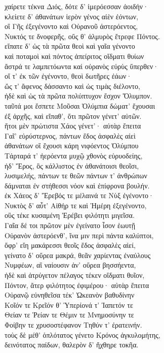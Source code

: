 \begin{pages}
\begin{Leftside}
\quad{}χαίρετε τέκνα Διός, δότε δ' ἱμερόεσσαν ἀοιδήν· \\
κλείετε δ' ἀθανάτων ἱερὸν γένος αἰὲν ἐόντων, \\
οἳ Γῆς ἐξεγένοντο καὶ Οὐρανοῦ ἀστερόεντος,\\
Νυκτός τε δνοφερῆς, οὕς θ' ἁλμυρὸς ἔτρεφε Πόντος.\\
εἴπατε δ' ὡς τὰ πρῶτα θεοὶ καὶ γαῖα γένοντο \\
καὶ ποταμοὶ καὶ πόντος ἀπείριτος οἴδματι θυίων \\
ἄστρά τε λαμπετόωντα καὶ οὐρανὸς εὐρὺς ὕπερθεν·  \\
οἵ τ' ἐκ τῶν ἐγένοντο, θεοὶ δωτῆρες ἐάων· \\
ὥς τ' ἄφενος δάσσαντο καὶ ὡς τιμὰς διέλοντο, \\
ἠδὲ καὶ ὡς τὰ πρῶτα πολύπτυχον ἔσχον Ὄλυμπον.\\
ταῦτά μοι ἔσπετε Μοῦσαι Ὀλύμπια δώματ' ἔχουσαι \\
ἐξ ἀρχῆς, καὶ εἴπαθ', ὅτι πρῶτον γένετ' αὐτῶν. \\

\quad{}ἤτοι μὲν πρώτιστα Χάος γένετ'· αὐτὰρ ἔπειτα\\
Γαῖ' εὐρύστερνος, πάντων ἕδος ἀσφαλὲς αἰεὶ\\
ἀθανάτων οἳ ἔχουσι κάρη νιφόεντος Ὀλύμπου \\
Τάρταρά τ' ἠερόεντα μυχῷ χθονὸς εὐρυοδείης,\\
ἠδ' Ἔρος, ὃς κάλλιστος ἐν ἀθανάτοισι θεοῖσι, \\
λυσιμελής, πάντων τε θεῶν πάντων τ' ἀνθρώπων\\
δάμναται ἐν στήθεσσι νόον καὶ ἐπίφρονα βουλήν.\\[5pt]

ἐκ Χάεος δ' Ἔρεβός τε μέλαινά τε Νὺξ ἐγένοντο· \\
Νυκτὸς δ' αὖτ' Αἰθήρ τε καὶ Ἡμέρη ἐξεγένοντο,\\
οὓς τέκε κυσαμένη Ἐρέβει φιλότητι μιγεῖσα. \\[5pt]

Γαῖα δέ τοι πρῶτον μὲν ἐγείνατο ἶσον ἑωυτῇ\\
Οὐρανὸν ἀστερόενθ', ἵνα μιν περὶ πάντα καλύπτοι,\\
ὄφρ' εἴη μακάρεσσι θεοῖς ἕδος ἀσφαλὲς αἰεί,\\
γείνατο δ' οὔρεα μακρά, θεᾶν χαρίεντας ἐναύλους \\
Νυμφέων, αἳ ναίουσιν ἀν' οὔρεα βησσήεντα,  \\
ἠδὲ καὶ ἀτρύγετον πέλαγος τέκεν οἴδματι θυῖον,\\
Πόντον, ἄτερ φιλότητος ἐφιμέρου· αὐτὰρ ἔπειτα\\
Οὐρανῷ εὐνηθεῖσα τέκ' Ὠκεανὸν βαθυδίνην \\
Κοῖόν τε Κρεῖόν θ' Ὑπερίονά τ' Ἰαπετόν τε\\
Θείαν τε Ῥείαν τε Θέμιν τε Μνημοσύνην τε \\
Φοίβην τε χρυσοστέφανον Τηθύν τ' ἐρατεινήν.\\
τοὺς δὲ μέθ' ὁπλότατος γένετο Κρόνος ἀγκυλομήτης,\\
δεινότατος παίδων, θαλερὸν δ' ἤχθηρε τοκῆα. \\


\end{Leftside}
\end{pages}
